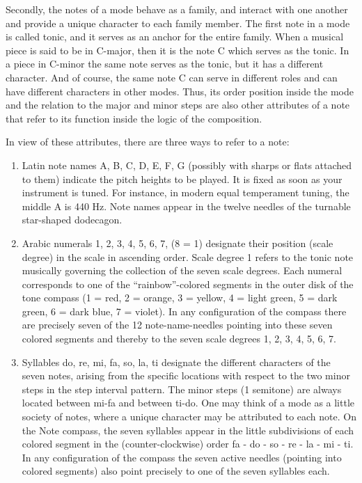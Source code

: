 Secondly, the notes of a mode behave as a family, and interact with one another and provide a unique character to each family member. The first note in a mode is called tonic, and it serves as an anchor for the entire family. When a musical piece is said to be in C-major, then it is the note C which serves as the tonic. In a piece in C-minor the same note serves as the tonic, but it has a different character. And of course, the same note C can serve in different roles and can have different characters in other modes. Thus, its order position inside the mode and the relation to the major and minor steps are also other attributes of a note that refer to its function inside the logic of the composition.

In view of these attributes, there are three ways to refer to a note:

\begin{enumerate}

\item Latin note names A, B, C, D, E, F, G (possibly with sharps or flats attached to them) indicate the pitch heights to be played. It is fixed as soon as your instrument is tuned. For instance, in modern equal temperament tuning, the middle A is 440 Hz. Note names appear in the twelve needles of the turnable star-shaped dodecagon.

\item Arabic numerals 1, 2, 3, 4, 5, 6, 7, (8 = 1) designate their position (scale degree) in the scale in ascending order. Scale degree 1 refers to the tonic note musically governing the collection of the seven scale degrees. Each numeral corresponds to one of the ``rainbow''-colored segments in the outer disk of the tone compass (1 = red, 2 = orange, 3 = yellow, 4 = light green, 5 = dark green, 6 = dark blue, 7 = violet). In any configuration of the compass there are precisely seven of the 12 note-name-needles pointing into these seven colored segments and thereby to the seven scale degrees 1, 2, 3, 4, 5, 6, 7.

\item Syllables do, re, mi, fa, so, la, ti designate the different characters of the seven notes, arising from the specific locations with respect to the two minor steps in the step interval pattern. The minor steps (1 semitone) are always located between mi-fa and between ti-do. One may think of a mode as a little society of notes, where a unique character may be attributed to each note. On the Note compass, the seven syllables appear in the little subdivisions of each colored segment in the (counter-clockwise) order fa - do - so - re - la - mi - ti. In any configuration of the compass the seven active needles (pointing into colored segments) also point precisely to one of the seven syllables each.

\end{enumerate}

